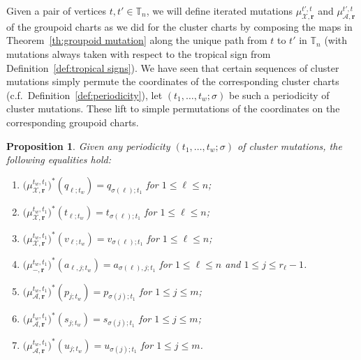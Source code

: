 \documentclass{amsart}
\newtheorem{proposition}[theorem]{Proposition}
\numberwithin{equation}{section}
\newcommand{\bfr}{{\boldsymbol{r}}}
\newcommand{\cA}{\mathcal{A}}
\newcommand{\cX}{\mathcal{X}}
\newcommand{\TT}{\mathbb{T}}
\begin{document}
Given a pair of vertices $t,t'\in\TT_n$, we will define iterated mutations $\mu_{\cX,\bfr}^{t',t}$ and $\mu_{\cA,\bfr}^{t',t}$ of the groupoid charts as we did for the cluster charts by composing the maps in Theorem~\ref{th:groupoid mutation} along the unique path from $t$ to $t'$ in $\TT_n$ (with mutations always taken with respect to the tropical sign from Definition~\ref{def:tropical signs}).
We have seen that certain sequences of cluster mutations simply permute the coordinates of the corresponding cluster charts (c.f.\ Definition~\ref{def:periodicity}), let $(t_1,\ldots,t_w;\sigma)$ be such a periodicity of cluster mutations.
These lift to simple permutations of the coordinates on the corresponding groupoid charts.
\begin{proposition}
  \label{prop:gpd periodicity}
  Given any periodicity $(t_1,\ldots,t_w;\sigma)$ of cluster mutations, the following equalities hold:
  \begin{enumerate}
    \item $\big(\mu_{\cX,\bfr}^{t_w,t_1}\big)^*(q_{\ell;t_w})=q_{\sigma(\ell);t_1}$ for $1\le\ell\le n$;
    \item $\big(\mu_{\cX,\bfr}^{t_w,t_1}\big)^*(t_{\ell;t_w})=t_{\sigma(\ell);t_1}$ for $1\le\ell\le n$;
    \item $\big(\mu_{\cX,\bfr}^{t_w,t_1}\big)^*(v_{\ell;t_w})=v_{\sigma(\ell);t_1}$ for $1\le\ell\le n$;
    \item $\big(\mu_{-,\bfr}^{t_w,t_1}\big)^*(a_{\ell,j;t_w})=a_{\sigma(\ell),j;t_1}$ for $1\le\ell\le n$ and $1\le j\le r_\ell-1$.
    \item $\big(\mu_{\cA,\bfr}^{t_w,t_1}\big)^*(p_{j;t_w})=p_{\sigma(j);t_1}$ for $1\le j\le m$;
    \item $\big(\mu_{\cA,\bfr}^{t_w,t_1}\big)^*(s_{j;t_w})=s_{\sigma(j);t_1}$ for $1\le j\le m$;
    \item $\big(\mu_{\cA,\bfr}^{t_w,t_1}\big)^*(u_{j;t_w})=u_{\sigma(j);t_1}$ for $1\le j\le m$.
  \end{enumerate}
\end{proposition}
\end{document}
